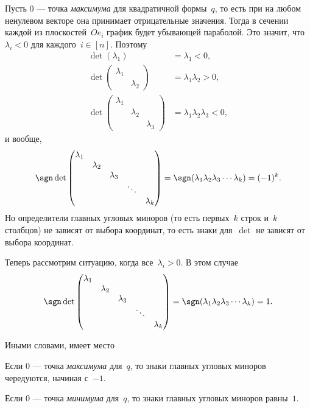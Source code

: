 Пусть $0$ --- точка \emph{максимума} для квадратичной формы~$q$, то есть при на любом ненулевом векторе она принимает отрицательные значения. Тогда в сечении каждой из плоскостей~$Oe_i$ график будет убывающей параболой. Это значит, что~$\lambda_i < 0$ для каждого~$i \in [n]$. Поэтому
\begin{align*}
	\det(\lambda_1) &= \lambda_1 < 0,
	\\
	\det{
		\begin{pmatrix}
			\lambda_1 & \\
			& \lambda_2
		\end{pmatrix}
	} &= \lambda_1\lambda_2 > 0,
	\\
	\det{
		\begin{pmatrix}
			\lambda_1 && \\
			& \lambda_2 \\
			&& \lambda_3
		\end{pmatrix}
	} &= \lambda_1\lambda_2\lambda_3 < 0,
\end{align*}
и вообще,
\[
	\sgn\det
		\begin{pmatrix}
			\lambda_1 && \\
			& \lambda_2 \\
			&& \lambda_3 \\
			&&& \ddots \\
			&&&& \lambda_k
		\end{pmatrix}
	=
	\sgn(\lambda_1 \lambda_2 \lambda_3 \cdots \lambda_k)
	=
	(-1)^k
	.
\]
Но определители главных угловых миноров (то есть первых~$k$ строк и~$k$ столбцов) не зависят от выбора координат, то есть знаки для~$\det$ не зависят от выбора координат.


Теперь рассмотрим ситуацию, когда все~$\lambda_i > 0$. В этом случае
\[
	\sgn\det
		\begin{pmatrix}
			\lambda_1 && \\
			& \lambda_2 \\
			&& \lambda_3 \\
			&&& \ddots \\
			&&&& \lambda_k
		\end{pmatrix}
	=
	\sgn(\lambda_1 \lambda_2 \lambda_3 \cdots \lambda_k)
	=
	1
	.
\]

Иными словами, имеет место
\begin{lemma}
	\label{lem:Silvester}
	Если $0$ --- точка \emph{максимума} для~$q$, то знаки главных угловых миноров чередуются, начиная с~$-1$.

	Если $0$ --- точка \emph{минимума} для~$q$, то знаки главных угловых миноров равны~$1$.
\end{lemma}

